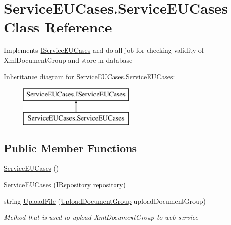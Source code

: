 \hypertarget{class_service_e_u_cases_1_1_service_e_u_cases}{\section{Service\-E\-U\-Cases.\-Service\-E\-U\-Cases Class Reference}
\label{class_service_e_u_cases_1_1_service_e_u_cases}
}


Implements \hyperlink{interface_service_e_u_cases_1_1_i_service_e_u_cases}{I\-Service\-E\-U\-Cases} and do all job for checking validity of Xml\-Document\-Group and store in database  


Inheritance diagram for Service\-E\-U\-Cases.\-Service\-E\-U\-Cases\-:\begin{figure}[H]
\begin{center}
\leavevmode
\includegraphics[height=2.000000cm]{class_service_e_u_cases_1_1_service_e_u_cases}
\end{center}
\end{figure}
\subsection*{Public Member Functions}
\begin{DoxyCompactItemize}
\item 
\hyperlink{class_service_e_u_cases_1_1_service_e_u_cases_aecef3d664c3db88a3abe454882449a5c}{Service\-E\-U\-Cases} ()
\item 
\hyperlink{class_service_e_u_cases_1_1_service_e_u_cases_a89687e7a389ec6ef033575968fdaea87}{Service\-E\-U\-Cases} (\hyperlink{interface_service_e_u_cases_1_1_repositories_1_1_i_repository}{I\-Repository} repository)
\item 
string \hyperlink{class_service_e_u_cases_1_1_service_e_u_cases_af90b39b3604b3f4d99e6c4061dfdcb5c}{Upload\-File} (\hyperlink{class_service_e_u_cases_1_1_upload_document_group}{Upload\-Document\-Group} upload\-Document\-Group)
\begin{DoxyCompactList}\small\item\em Method that is used to upload Xml\-Document\-Group to web service \end{DoxyCompactList}\end{DoxyCompactItemize}


